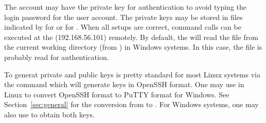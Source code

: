 The account may have the private key for authentication to avoid typing
the login password for the user account.
The private keys may be stored in files indicated by
 for  or
 for .
When all setups are correct, command calls can be executed at the
 (192.168.56.101) remotely.
By default, the  will read the file from the current
working directory (from ) in Windows systems.
In this case, the file
 is probably read
for authentication.

To generat private and public keys
is pretty standard for most Linux systems via the  command
which will generate keys in OpenSSH format.
One may use  in Linux to convert OpenSSH format to
PuTTY format for Windows.
See Section~\ref{sec:general} for the conversion from  to
.
For Windows systems, one may also use  to obtain both keys.

